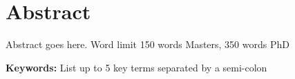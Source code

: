 \chapter*{Abstract}


Abstract goes here. Word limit 150 words Masters, 350 words PhD



\bigskip
\bigskip
\bigskip
\bigskip

\noindent \textbf{Keywords:} List up to 5 key terms separated by a semi-colon